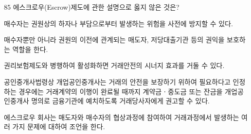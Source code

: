 \begin{question}{85}
에스크로우(Escrow)제도에 관한 설명으로 옳지 않은 것은?
\begin{choices}
  \item 매수자는 권원상의 하자나 부담으로부터 발생하는 위험을 사전에 방지할 수 있다.
  \item 매수자뿐만 아니라 권원의 이전에 관계되는 매도자, 저당대출기관 등의 권익을 보호하는 역할을 한다.
  \item 권리보험제도와 병행하여 활성화하면 거래안전의 시너지 효과를 거둘 수 있다.
  \item 공인중개사법령상 개업공인중개사는 거래의 안전을 보장하기 위하여 필요하다고 인정하는 경우에는 거래계약의 이행이 완료될 때까지 계약금ㆍ중도금 또는 잔금을 개업공인중개사 명의로 금융기관에 예치하도록 거래당사자에게 권고할 수 있다.
  \item 에스크로우 회사는 매도자와 매수자의 협상과정에 참여하여 거래과정에서 발생하는 여러 가지 문제에 대하여 조언을 한다.
\end{choices}
\end{question}
